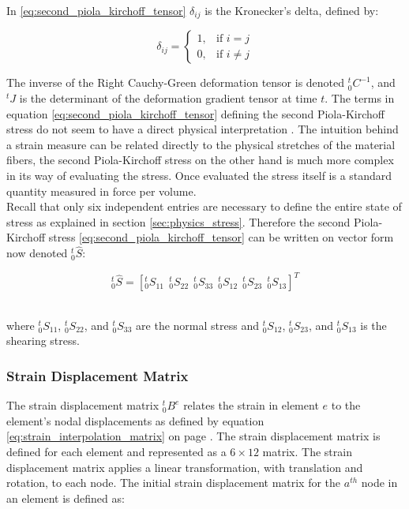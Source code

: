 In \eqref{eq:second_piola_kirchoff_tensor} $\delta_{ij}$ is the
Kronecker's delta, defined by:

\begin{equation}
  \delta_{ij} = \left\{\begin{matrix} 1, & \mbox{if } i=j \\ 0, &
      \mbox{if } i \ne j \end{matrix}\right. 
\end{equation}

The inverse of the Right Cauchy-Green deformation tensor is denoted
$^t_0C^{-1}$, and $^tJ$ is the determinant of the
deformation gradient tensor at time $t$.
%
The terms in equation \eqref{eq:second_piola_kirchoff_tensor} defining
the second Piola-Kirchoff stress do not seem to have a 
direct physical interpretation
. The intuition behind a strain
measure can be related directly to the physical stretches of the
material fibers, the second Piola-Kirchoff stress on the other hand is
much more complex in its way of evaluating the stress. Once evaluated
the stress itself is a standard quantity measured in force per volume. \\

Recall that only six independent entries are necessary to define the
entire state of stress as explained in section
\vref{sec:physics_stress}. Therefore the second Piola-Kirchoff
stress \eqref{eq:second_piola_kirchoff_tensor} can be written on
vector form now denoted $^t_0\hat{S}$:

\begin{equation*}
\label{eq:stress_tensor_vector_form}
^t_0\hat{S} = [^t_0S_{11} \ \ ^t_0S_{22} \ \ ^t_0S_{33} \ \ 
^t_0S_{12} \ \ ^t_0S_{23} \ \ ^t_0S_{13}]^T
\end{equation*} \

where $^t_0S_{11}$, $^t_0S_{22}$, and $^t_0S_{33}$ are the normal
stress and $^t_0S_{12}$, $^t_0S_{23}$, and $^t_0S_{13}$ is the
shearing stress.

\subsubsection*{Strain Displacement Matrix}
The strain displacement matrix $^t_0B^{e}$ relates the strain in
element $e$ to the element's nodal displacements as defined by
equation \eqref{eq:strain_interpolation_matrix} on page
\pageref{eq:strain_interpolation_matrix}. 
The strain displacement matrix is defined for each element and
represented as a $6 \times 12$ matrix. The strain displacement matrix
applies a linear transformation, with translation and rotation, to
each node. The initial strain displacement matrix for the $a^{th}$
node in an element is defined as:

